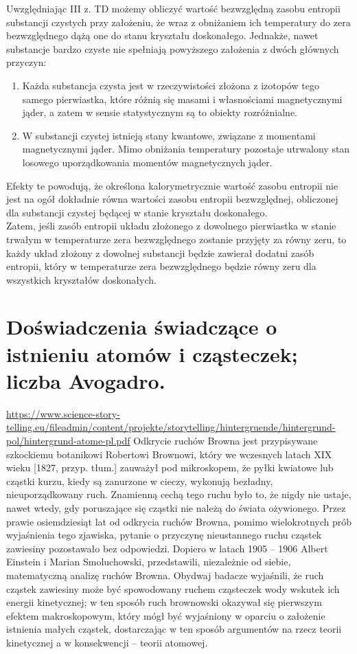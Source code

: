 \documentclass{article}
\begin{document}
Uwzględniając III z. TD możemy obliczyć wartość bezwzględną zasobu entropii substancji czystych przy założeniu, że wraz z obniżaniem ich temperatury do zera bezwzględnego dążą one do stanu kryształu doskonałego. Jednakże, nawet substancje bardzo czyste nie spełniają powyższego założenia z dwóch głównych przyczyn:
\begin{enumerate}
    \item Każda substancja czysta jest w rzeczywistości złożona z izotopów tego samego pierwiastka, które różnią się masami i własnościami magnetycznymi jąder, a zatem w sensie statystycznym są to obiekty rozróżnialne.
    \item W substancji czystej istnieją stany kwantowe, związane z momentami magnetycznymi jąder. Mimo obniżania temperatury pozostaje utrwalony stan losowego uporządkowania momentów magnetycznych jąder. 
\end{enumerate}
Efekty te powodują, że określona kalorymetrycznie wartość zasobu entropii nie jest na ogół dokładnie równa wartości zasobu entropii bezwzględnej, obliczonej dla substancji czystej będącej w stanie kryształu doskonałego. \\
Zatem, jeśli zasób entropii układu złożonego z dowolnego pierwiastka w stanie trwałym w temperaturze zera bezwzględnego zostanie przyjęty za równy zeru, to każdy układ złożony z dowolnej substancji będzie zawierał dodatni zasób entropii, który w temperaturze zera bezwzględnego będzie równy zeru dla wszystkich kryształów doskonałych. 

\section{Doświadczenia świadczące o istnieniu atomów i cząsteczek; liczba Avogadro.}
\url{https://www.science-story-telling.eu/fileadmin/content/projekte/storytelling/hintergruende/hintergrund-pol/hintergrund-atome-pl.pdf}
Odkrycie ruchów Browna jest przypisywane szkockiemu botanikowi Robertowi Brownowi, który we wczesnych latach XIX wieku [1827, przyp. tłum.] zauważył pod mikroskopem, że pyłki kwiatowe lub cząstki kurzu, kiedy są zanurzone w
cieczy, wykonują bezładny, nieuporządkowany ruch. Znamienną cechą tego ruchu było to, że nigdy nie ustaje, nawet wtedy, gdy poruszające się cząstki nie należą do świata ożywionego. 
Przez prawie osiemdziesiąt lat od odkrycia ruchów Browna, pomimo wielokrotnych prób wyjaśnienia tego zjawiska, pytanie o przyczynę nieustannego ruchu cząstek zawiesiny pozostawało bez odpowiedzi. Dopiero w latach 1905 – 1906 Albert Einstein i Marian Smoluchowski, przedstawili,
niezależnie od siebie, matematyczną analizę ruchów Browna. Obydwaj badacze wyjaśnili, że ruch cząstek zawiesiny może być spowodowany ruchem cząsteczek wody wskutek ich energii
kinetycznej; w ten sposób ruch brownowski okazywał się pierwszym efektem makroskopowym, który mógł być wyjaśniony w oparciu o założenie istnienia małych cząstek, dostarczając w ten sposób argumentów na rzecz teorii kinetycznej a w konsekwencji – teorii atomowej. 
\end{document}
